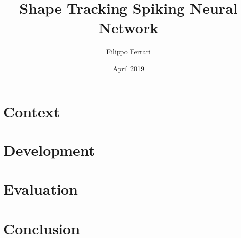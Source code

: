 \documentclass[12pt]{report}
\title{Shape Tracking Spiking Neural Network}
\author{Filippo Ferrari}
\date{April 2019}
\begin{document}







\tableofcontents

\listoffigures


\chapter{Context}
\setcounter{page}{1}

\newpage

\chapter{Development}

\newpage

\chapter{Evaluation}

\newpage

\chapter{Conclusion}

\newpage

% 

%


\printbibliography[heading=bibintoc]
\end{document}
